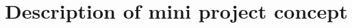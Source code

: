 \chapter{Description of mini project concept}

\iffalse
Description of mini project concept. The mini project can be based on parts of your semester project but should be able to run independently of the rest of the project.
\fi